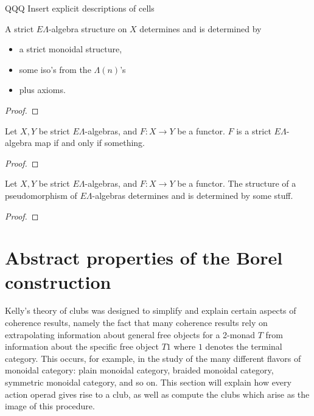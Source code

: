 \documentclass{amsbook} %
\newcommand{\mb}{\mathbf}
\newcommand{\EL}{E\Lambda}
\numberwithin{section}{chapter}
\begin{document}
QQQ Insert explicit descriptions of cells
\begin{prop}\label{el_via_moncats}
A strict $\EL$-algebra structure on $X$ determines and is determined by
\begin{itemize}
\item a strict monoidal structure,
\item some iso's from the $\Lambda(n)$'s
\item plus axioms.
\end{itemize}
\end{prop}
\begin{proof}

\end{proof}

\begin{prop}\label{el_strictmap}
Let $X,Y$ be strict $\EL$-algebras, and $F:X \to Y$ be a functor. $F$ is a strict $\EL$-algebra map if and only if something.
\end{prop}
\begin{proof}

\end{proof}

\begin{prop}\label{el_weakmap}
Let $X,Y$ be strict $\EL$-algebras, and $F:X \to Y$ be a functor. The structure of a pseudomorphism of $\EL$-algebras determines and is determined by some stuff.
\end{prop}
\begin{proof}

\end{proof}
\section{Abstract properties of the Borel construction}

Kelly's theory of clubs \cite{kelly_club1, kelly_club0, kelly_club2} was designed to simplify and explain certain aspects of coherence results, namely the fact that many coherence results rely on extrapolating information about general free objects for a 2-monad $T$ from information about the specific free object $T1$ where $1$ denotes the terminal category.  This occurs, for example, in the study of the many different flavors of monoidal category:  plain monoidal category, braided monoidal category, symmetric monoidal category, and so on.  This section will explain how every action operad gives rise to a club, as well as compute the clubs which arise as the image of this procedure.
\end{document}
